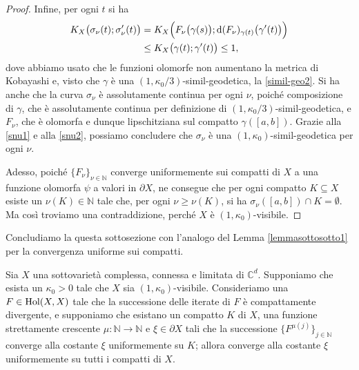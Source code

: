 \begin{proof}
    Infine, per ogni $t$ si ha
    \begin{equation} \label{snu2}
        \begin{aligned}
            K_X\big(\sigma_\nu(t);\sigma_\nu'(t)\big)&=K_X\Big(F_\nu\big(\gamma(s)\big);\mathop{}\!\mathrm{d}(F_\nu)_{\gamma(t)}\big(\gamma'(t)\big)\Big) \\
            &\le K_X\big(\gamma(t);\gamma'(t)\big) \le 1,
        \end{aligned}
    \end{equation}
    dove abbiamo usato che le funzioni olomorfe non aumentano la metrica di Kobayashi e, visto che $\gamma$ è una $(1,\kappa_0/3)$-simil-geodetica, la \eqref{simil-geo2}. Si ha anche che la curva $\sigma_\nu$ è assolutamente continua per ogni $\nu$, poiché composizione di $\gamma$, che è assolutamente continua per definizione di $(1,\kappa_0/3)$-simil-geodetica, e $F_\nu$, che è olomorfa e dunque lipschitziana sul compatto $\gamma([a,b])$. Grazie alla \eqref{snu1} e alla \eqref{snu2}, possiamo concludere che $\sigma_\nu$ è una $(1,\kappa_0)$-simil-geodetica per ogni $\nu$.
    
    Adesso, poiché $\{F_\nu\}_{\nu\in\mathbb{N}}$ converge uniformemente sui compatti di $X$ a una funzione olomorfa $\psi$ a valori in $\partial X$, ne consegue che per ogni compatto $K\subseteq X$ esiste un $\nu(K)\in\mathbb{N}$ tale che, per ogni $\nu\ge\nu(K)$, si ha $\sigma_\nu([a,b])\cap K=\emptyset$. Ma così troviamo una contraddizione, perché $X$ è $(1,\kappa_0)$-visibile.
\end{proof}

Concludiamo la questa sottosezione con l'analogo del Lemma \ref{lemmasottosotto1} per la convergenza uniforme sui compatti.

\begin{lm} \label{lemmasottosotto2}
    Sia $X$ una sottovarietà complessa, connessa e limitata di $\mathbb{C}^d$. Supponiamo che esista un $\kappa_0>0$ tale che $X$ sia $(1,\kappa_0)$-visibile. Consideriamo una $F\in\textnormal{Hol}(X,X)$ tale che la successione delle iterate di $F$ è compattamente divergente, e supponiamo che esistano un compatto $K$ di $X$, una funzione strettamente crescente $\mu:\mathbb{N}\longrightarrow\mathbb{N}$ e $\xi\in\partial X$ tali che la successione $\{F^{\mu(j)}\}_{j\in\mathbb{N}}$ converge alla costante $\xi$ uniformemente su $K$; allora converge alla costante $\xi$ uniformemente su tutti i compatti di $X$.
\end{lm}

